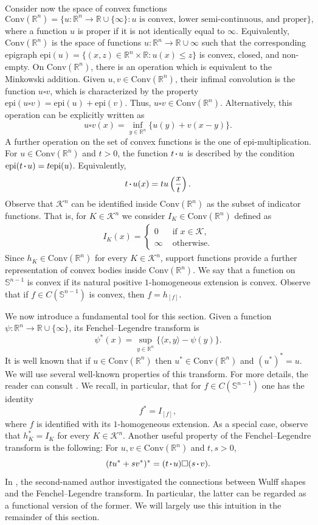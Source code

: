 \documentclass[a4paper, 11pt]{article}
\newcommand{\R}{\mathbb{R}}
\newcommand{\sph}{\mathbb{S}}
\newcommand{\K}{\mathcal{K}}
\theoremstyle{definition}
\newcommand*\sq{\mathbin{\vcenter{\hbox{\rule{.3ex}{.3ex}}}}}
\newcommand{\Conv}{\mathrm{Conv}}
\newcommand{\epi}{\mathrm{epi}}
\begin{document}
Consider now the space of convex functions \[ \Conv(\R^n)=\{u: \R^n \to \R\cup \{\infty\}: u \text{ is convex, lower semi-continuous, and proper} \},\] where a function $u$ is proper if it is not identically equal to $\infty$. Equivalently, $\Conv(\R^n)$ is the space of functions $u: \R^n \to \R\cup\infty$ such that the corresponding epigraph $\epi(u)=\{(x,z) \in \R^n \times \R: u(x) \leq z \}$ is convex, closed, and non-empty.
On $\Conv(\R^n)$, there is an operation which is equivalent to the Minkowski addition. Given $u, v \in \Conv(\R^n)$, their infimal convolution is the function $u \square v$, which is characterized by the property $\epi(u \square v)=\epi(u)+\epi(v)$. Thus, $u \square v \in \Conv(\R^n)$. Alternatively, this operation can be explicitly written as \[ u \square v(x)= \inf_{y \in \R^n} \{ u(y)+v(x-y) \}.\] A further operation on the set of convex functions is the one of epi-multiplication. For $u \in \Conv(\R^n)$ and $t>0$, the function $t \sq u$ is described by the condition $\epi(t \sq u)=t\epi(u)$. Equivalently, \[t\sq u(x) = t u\left( \frac{x}{t} \right).\]
Observe that $\K^n$ can be identified inside $\Conv(\R^n)$ as the subset of indicator functions. That is, for $K \in \K^n$ we consider $I_K \in \Conv(\R^n)$ defined as 
\begin{align*}
     I_K(x)=\begin{cases}
        0  & \text{ if }x \in \K,\\
        \infty & \text{ otherwise.}
    \end{cases}
\end{align*}
Since $h_K \in \Conv(\R^n)$ for every $K \in \K^n$, support functions provide a further representation of convex bodies inside $\Conv(\R^n)$. We say that a function on $\sph^{n-1}$ is convex if its natural positive $1$-homogeneous extension is convex. Observe that if $f \in C(\sph^{n-1})$ is convex, then $f=h_{[f]}$.

We now introduce a fundamental tool for this section. Given a function $\psi: \R^n \to \R \cup \{\infty\}$, its Fenchel--Legendre transform is \[ \psi^*(x)=\sup_{y \in \R^n}\{ \langle x, y \rangle - \psi(y)\}.\] It is well known that if $u \in \Conv(\R^n)$ then $u^* \in \Conv(\R^n)$ and $(u^*)^*=u$. We will use several well-known properties of this transform. For more details, the reader can consult \cite[Section 26]{RockafellarConvex1997}. We recall, in particular, that for $f \in C(\sph^{n-1})$ one has the identity
\begin{equation}\label{eq:FL_Wulff}
    f^*=I_{[f]},
\end{equation}
where $f$ is identified with its $1$-homogeneous extension. As a special case, observe that $h_K^*=I_K$ for every $K \in \K^n$. Another useful property of the Fenchel--Legendre transform is the following: For $u,v \in \Conv(\R^n)$ and $t,s>0$,
\begin{equation}\label{eq:sums_FL}
    (tu^*+sv^*)^*=(t \sq u) \square (s \sq v).
\end{equation} 
In \cite{Ulivelli_Wulff}, the second-named author investigated the connections between Wulff shapes and the Fenchel--Legendre transform. In particular, the latter can be regarded as a functional version of the former. We will largely use this intuition in the remainder of this section.
\end{document}
